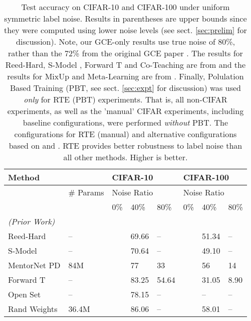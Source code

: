 \documentclass{article}
\begin{document}
\begin{table*}[!htbp]
\renewcommand{\arraystretch}{1.3}
\centering
\caption{Test accuracy on CIFAR-10 and CIFAR-100 under uniform symmetric label noise. Results in parentheses are upper bounds since they were computed using lower noise levels (see sect. \ref{sec:prelim} for discussion). Note, our GCE-only results use true noise of 80\%, rather than the 72\% from the original GCE paper \cite{zhang2018}.  The results for Reed-Hard, S-Model \cite{goldberger2016}, Forward T and Co-Teaching are from \cite{nguyen2020} and the results for MixUp and Meta-Learning are from \cite{li2020}.  Finally, Polulation Based Training (PBT, see sect. \ref{sec:expt} for discussion) was used \emph{only} for RTE (PBT) experiments. That is, all non-CIFAR experiments, as well as the 'manual' CIFAR experiments, including baseline configurations, were performed \emph{without} PBT. The configurations for RTE (manual) and alternative configurations based on \cite{Berthelot2020ReMixMatch:} and \cite{hendrycks2020augmix}.  RTE provides better robustness to label noise than all other methods. Higher is better.}\label{tab:uniformnoise}
\begin{tabular}{llllllll}
\toprule
Method                           &           &\multicolumn{3}{l}{CIFAR-10}    & \multicolumn{3}{l}{CIFAR-100}     \\
\hline
                                 & \# Params & \multicolumn{3}{l}{Noise Ratio} & \multicolumn{3}{l}{Noise Ratio} \\
                                 &           & 0\% & 40\%         & 80\%    &0\%      & 40\%           & 80\%        \\
\emph{(Prior Work)} \\[1ex]
Reed-Hard \cite{reed2014}       & --        && 69.66        & --          && 51.34        & --             \\
S-Model  \cite{goldberger2016}  & --        && 70.64        & --          && 49.10        & --             \\
MentorNet PD \cite{jiang2018}   & 84M       && 77           & 33          && 56           & 14           \\
Forward T \cite{patrini2016}    & --        && 83.25        & 54.64       && 31.05        & 8.90         \\
Open Set \cite{wang2018}        & --        && 78.15        & --          && --           & --             \\
Rand Weights \cite{ren2018}     & 36.4M     && 86.06        & --          && 58.01        & --             \\

\end{tabular}
\end{table*}
\end{document}
